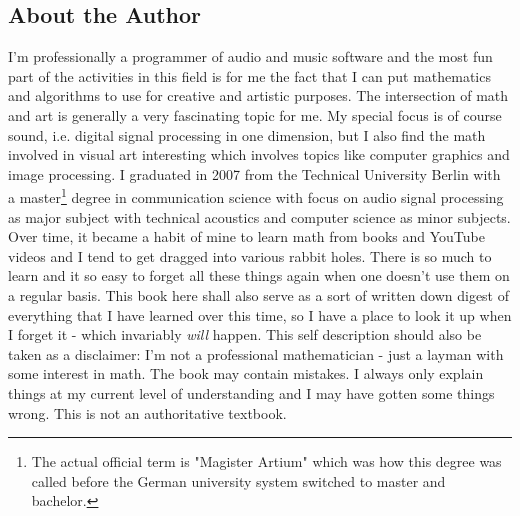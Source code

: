 

\subsection{About the Author}
I'm professionally a programmer of audio and music software and the most fun part of the activities in this field is for me the fact that I can put mathematics and algorithms to use for creative and artistic purposes. The intersection of math and art is generally a very fascinating topic for me. My special focus is of course sound, i.e. digital signal processing in one dimension, but I also find the math involved in visual art interesting which involves topics like computer graphics and image processing. I graduated in 2007 from the Technical University Berlin with a master\footnote{The actual official term is "Magister Artium" which was how this degree was called before the German university system switched to master and bachelor.} degree in communication science with focus on audio signal processing as major subject with technical acoustics and computer science as minor subjects. Over time, it became a habit of mine to learn math from books and YouTube videos and I tend to get dragged into various rabbit holes. There is so much to learn and it so easy to forget all these things again when one doesn't use them on a regular basis. This book here shall also serve as a sort of written down digest of everything that I have learned over this time, so I have a place to look it up when I forget it - which invariably \emph{will} happen. This self description should also be taken as a disclaimer: I'm not a professional mathematician - just a layman with some interest in math. The book may contain mistakes. I always only explain things at my current level of understanding and I may have gotten some things wrong. This is not an authoritative textbook.

